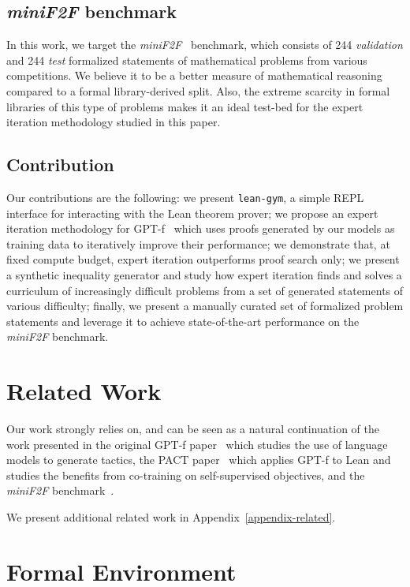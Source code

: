 \documentclass[nohyperref]{article}
\theoremstyle{plain}
\theoremstyle{definition}
\theoremstyle{remark}
\begin{document}
\subsection{\textit{miniF2F} benchmark}

In this work, we target the \textit{miniF2F}~\cite{zheng2021minif2f} benchmark, which consists of 244 \textit{validation} and 244 \textit{test} formalized statements of mathematical problems from various competitions. We believe it to be a better measure of mathematical reasoning compared to a formal library-derived split. Also, the extreme scarcity in formal libraries of this type of problems makes it an ideal test-bed for the expert iteration methodology studied in this paper.

\subsection{Contribution}

Our contributions are the following: we present \texttt{lean-gym}, a simple REPL interface for interacting with the Lean theorem prover; we propose an expert iteration methodology for GPT-f~\cite{polu2020generative} which uses proofs generated by our models as training data to iteratively improve their performance; we demonstrate that, at fixed compute budget, expert iteration outperforms proof search only; we present a synthetic inequality generator and study how expert iteration finds and solves a curriculum of increasingly difficult problems from a set of generated statements of various difficulty; finally, we present a manually curated set of formalized problem statements and leverage it to achieve state-of-the-art performance on the \textit{miniF2F} benchmark.

\section{Related Work}

Our work strongly relies on, and can be seen as a natural continuation of the work presented in the original GPT-f paper~\cite{polu2020generative} which studies the use of language models to generate tactics, the PACT paper~\cite{han2021proof} which applies GPT-f to Lean and studies the benefits from co-training on self-supervised objectives, and the \textit{miniF2F} benchmark~\cite{zheng2021minif2f}.

We present additional related work in Appendix~\ref{appendix-related}.

\section{Formal Environment}
\end{document}
